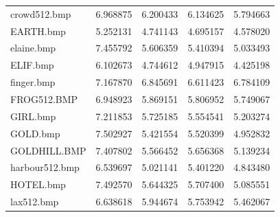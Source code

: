 \documentclass{article}
\begin{document}
\begin{table}[H]
\begin{tabular}{lrrrr}
    crowd512.bmp       & 6.968875                     & 6.200433                               & 6.134625                                  & 5.794663                                   \\
    EARTH.bmp          & 5.252131                     & 4.741143                               & 4.695157                                  & 4.578020                                   \\
    elaine.bmp         & 7.455792                     & 5.606359                               & 5.410394                                  & 5.033493                                   \\
    ELIF.bmp           & 6.102673                     & 4.744612                               & 4.947915                                  & 4.425198                                   \\
    finger.bmp         & 7.167870                     & 6.845691                               & 6.611423                                  & 6.784109                                   \\
    FROG512.BMP        & 6.948923                     & 5.869151                               & 5.806952                                  & 5.749067                                   \\
    GIRL.bmp           & 7.211853                     & 5.725185                               & 5.554541                                  & 5.203274                                   \\
    GOLD.bmp           & 7.502927                     & 5.421554                               & 5.520399                                  & 4.952832                                   \\
    GOLDHILL.BMP       & 7.407802                     & 5.566452                               & 5.656368                                  & 5.139234                                   \\
    harbour512.bmp     & 6.539697                     & 5.021141                               & 5.401220                                  & 4.843480                                   \\
    HOTEL.bmp          & 7.492570                     & 5.644325                               & 5.707400                                  & 5.085551                                   \\
    lax512.bmp         & 6.638618                     & 5.944674                               & 5.753942                                  & 5.462067                                   \\

\end{tabular}
\end{table}
\end{document}
